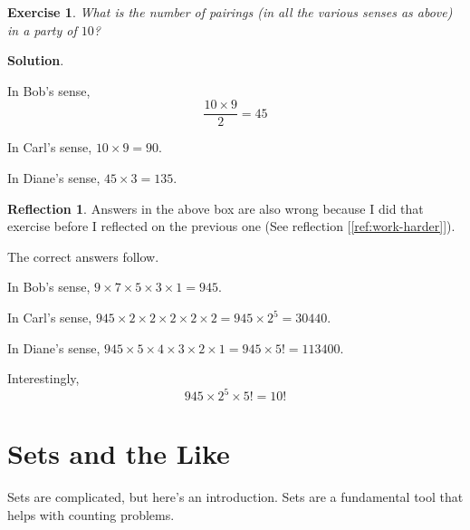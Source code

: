 \documentclass[11pt]{book}
\theoremstyle{definition}
\theoremstyle{plain}
\newtheorem{exercise}{Exercise}
\theoremstyle{definition}
\theoremstyle{problemstyle}
\theoremstyle{remark}
\theoremstyle{definition}
\newtheorem{reflection}{Reflection}
\begin{document}
\begin{exercise}
    What is the number of pairings (in all the various senses as above) in a party of $10$?
    \label{ex:1.1.3}
\end{exercise}
\textbf{Solution}.

\begin{mybox}
\label{box:wrongagain}
In Bob's sense, 
\[
    \frac{10\times 9}{2}=45
\]

In Carl's sense, $10\times 9=90$.

In Diane's sense, $45\times 3=135$.
\end{mybox}

\begin{reflection}
    Answers in the above box are also wrong because I did that exercise before I reflected on the previous one (See reflection [\ref{ref:work-harder}]).

    The correct answers follow.

In Bob's sense, $9\times 7\times 5\times 3\times 1=945$.

    In Carl's sense, $945\times 2\times2\times2\times2\times2=945\times 2^5=\num{30440}$.

    In Diane's sense, $945\times5\times4\times3\times2\times1=945\times 5!=\num{113400}$.

Interestingly, 
    \[
        945\times2^5\times5!=10!
    \]
\end{reflection}

\section{Sets and the Like}
Sets are complicated, but here's an introduction. Sets are a fundamental tool that helps with counting problems.
\end{document}
